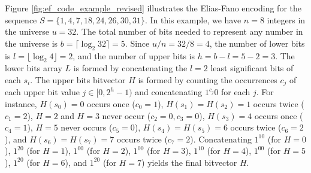 Figure \ref{fig:ef_code_example_revised} illustrates the Elias-Fano encoding for the sequence $S = \{1, 4, 7, 18, 24, 26, 30, 31\}$. In this example, we have $n=8$ integers in the universe $u=32$. The total number of bits needed to represent any number in the universe is $b=\lceil \log_2 32 \rceil = 5$. Since $u/n = 32/8 = 4$, the number of lower bits is $l = \lfloor \log_2 4 \rfloor = 2$, and the number of upper bits is $h=b-l=5-2=3$. The lower bits array $L$ is formed by concatenating the $l=2$ least significant bits of each $s_i$. The upper bits bitvector $H$ is formed by counting the occurrences $c_j$ of each upper bit value $j \in [0, 2^h-1)$ and concatenating $1^{c_j}0$ for each $j$. For instance, $H(s_0)=0$ occurs once ($c_0=1$), $H(s_1)=H(s_2)=1$ occurs twice ($c_1=2$), $H=2$ and $H=3$ never occur ($c_2=0, c_3=0$), $H(s_3)=4$ occurs once ($c_4=1$), $H=5$ never occurs ($c_5=0$), $H(s_4)=H(s_5)=6$ occurs twice ($c_6=2$), and $H(s_6)=H(s_7)=7$ occurs twice ($c_7=2$). Concatenating $1^10$ (for $H=0$), $1^20$ (for $H=1$), $1^00$ (for $H=2$), $1^00$ (for $H=3$), $1^10$ (for $H=4$), $1^00$ (for $H=5$), $1^20$ (for $H=6$), and $1^20$ (for $H=7$) yields the final bitvector $H$.

